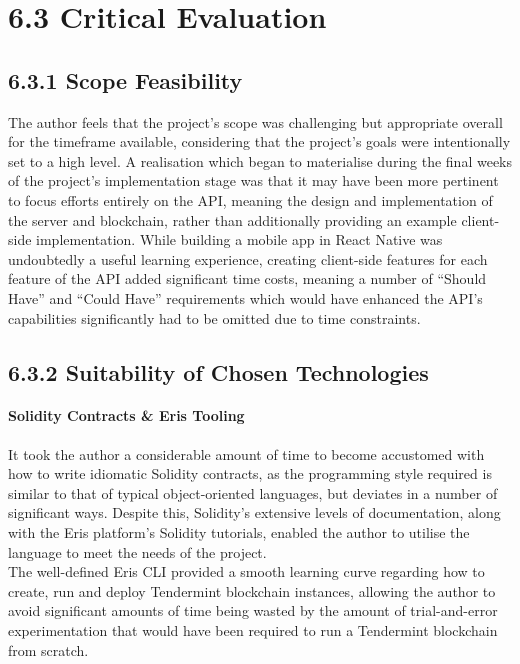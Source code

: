 \section{6.3 Critical Evaluation}\label{critical-evaluation}

\subsection{6.3.1 Scope Feasibility}\label{scope-feasibility}

The author feels that the project's scope was challenging but
appropriate overall for the timeframe available, considering that the
project's goals were intentionally set to a high level. A realisation
which began to materialise during the final weeks of the project's
implementation stage was that it may have been more pertinent to focus
efforts entirely on the API, meaning the design and implementation of
the server and blockchain, rather than additionally providing an example
client-side implementation. While building a mobile app in React Native
was undoubtedly a useful learning experience, creating client-side
features for each feature of the API added significant time costs,
meaning a number of ``Should Have'' and ``Could Have'' requirements
which would have enhanced the API's capabilities significantly had to be
omitted due to time constraints.

\subsection{6.3.2 Suitability of Chosen
Technologies}\label{suitability-of-chosen-technologies}

\paragraph{Solidity Contracts \& Eris
Tooling}\label{solidity-contracts-eris-tooling}

It took the author a considerable amount of time to become accustomed
with how to write idiomatic Solidity contracts, as the programming style
required is similar to that of typical object-oriented languages, but
deviates in a number of significant ways. Despite this, Solidity's
extensive levels of documentation, along with the Eris platform's
Solidity tutorials, enabled the author to utilise the language to meet
the needs of the project.\\
The well-defined Eris CLI provided a smooth learning curve regarding how
to create, run and deploy Tendermint blockchain instances, allowing the
author to avoid significant amounts of time being wasted by the amount
of trial-and-error experimentation that would have been required to run
a Tendermint blockchain from scratch.

